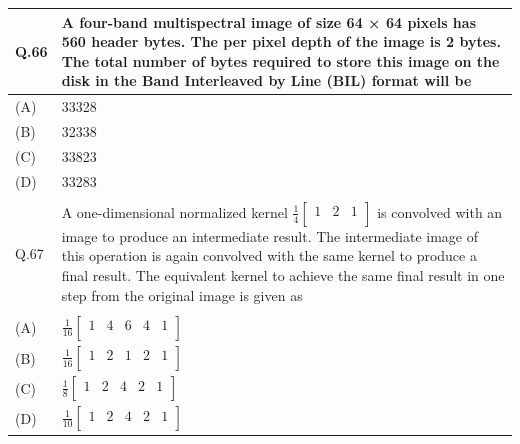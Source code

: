 \documentclass[12pt]{article}
\begin{document}
\begin{table}[H]
\renewcommand{\arraystretch}{3}
\setlength{\tabcolsep}{8pt}
\begin{tabular}{|l|p{15cm}|}
\hline
 
Q.66& A four-band multispectral image of size 64 × 64 pixels has 560 header bytes. The
per pixel depth of the image is 2 bytes. The total number of bytes required to store
this image on the disk in the Band Interleaved by Line (BIL) format will be\\ \hline 
(A)&33328\\ \hline
(B)&32338\\ \hline
(C)&33823\\ \hline
(D)&33283\\ \hline
 & \\ \hline

Q.67 &A one-dimensional normalized kernel $ \frac{1}{4} [\begin{smallmatrix}1 & 2 & 1\\ \end{smallmatrix} ] $ is convolved with an image to produce an intermediate result. The intermediate image of this operation is again convolved with the same kernel to produce a final result. The equivalent kernel to
achieve the same final result in one step from the original image is given as\\ \hline
 & \\ \hline
(A)&$ \frac{1}{16}[\begin{smallmatrix}1 & 4 & 6&4&1\\ \end{smallmatrix} ] $\\ \hline
(B)&$ \frac{1}{16}[ \begin{smallmatrix}1 & 2 & 1&2&1\\ \end{smallmatrix} ] $\\ \hline
(C)&$ \frac{1}{8}[ \begin{smallmatrix}1 & 2 & 4&2&1\\ \end{smallmatrix} ] $\\ \hline
(D)&$ \frac{1}{10}[ \begin{smallmatrix}1 & 2 & 4&2&1\\ \end{smallmatrix} ] $\\ \hline

\end{tabular}
\end{table}
 \newpage
 
\end{document}
